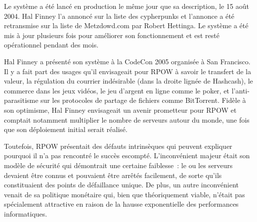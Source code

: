 Le système a été lancé en production le même jour que sa description, le 15 août 2004. Hal Finney l'a annoncé sur la liste des cypherpunks et l'annonce a été retransmise sur la liste de Metzdowd.com par Robert Hettinga. Le système a été mis à jour plusieurs fois pour améliorer son fonctionnement et est resté opérationnel pendant des mois.

Hal Finney a présenté son système à la CodeCon 2005 organisée à San Francisco. Il y a fait part des usages qu'il envisageait pour RPOW à savoir le transfert de la valeur, la régulation du courrier indésirable (dans la droite lignée de Hashcash), le commerce dans les jeux vidéos, le jeu d'argent en ligne comme le poker, et l'anti-parasitisme sur les protocoles de partage de fichiers comme BitTorrent. Fidèle à son optimisme, Hal Finney envisageait un avenir prometteur pour RPOW et comptait notamment multiplier le nombre de serveurs autour du monde, une fois que son déploiement initial serait réalisé.

Toutefois, RPOW présentait des défauts intrinsèques qui peuvent expliquer pourquoi il n'a pas rencontré le succès escompté. L'inconvénient majeur était son modèle de sécurité qui démontrait une certaine faiblesse~: le ou les serveurs devaient être connus et pouvaient être arrêtés facilement, de sorte qu'ils constituaient des points de défaillance unique. De plus, un autre inconvénient venait de sa politique monétaire qui, bien que théoriquement viable, n'était pas spécialement attractive en raison de la hausse exponentielle des performances informatiques.

